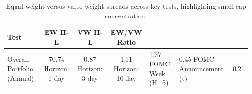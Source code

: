 \begin{table}[ht]
\centering
\caption{Equal-weight versus value-weight spreads across key tests, highlighting small-cap concentration.}
\label{tab:ew_vw_summary}
\begin{tabular}{lccc}
\toprule
Test & EW H-L & VW H-L & EW/VW Ratio \\
\midrule
Overall Portfolio (Annual) & 70.74%
Horizon: 1-day & 0.87%
Horizon: 3-day & 1.11%
Horizon: 10-day & 1.37%
FOMC Week (H=5) & 0.45%
FOMC Announcement (t) & 0.21%
\bottomrule
\end{tabular}
\end{table}

